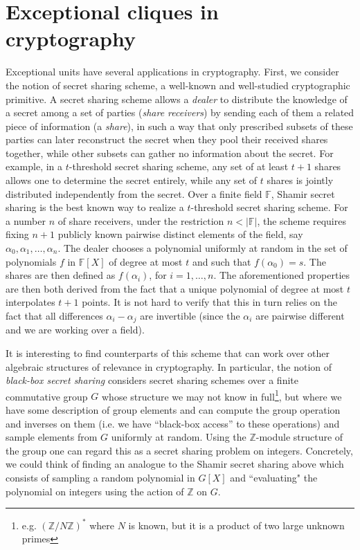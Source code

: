 \documentclass{amsart}
\theoremstyle{plain}
\theoremstyle{definition}
\newcommand{\Z}{\ensuremath{\mathbb{Z}}}
\newcommand{\F}{\ensuremath{\mathbb{F}}}
\begin{document}
\section{Exceptional cliques in cryptography}\label{sec:exceptional_cliques_in_cryptography}

Exceptional units have several applications in cryptography. First, we consider the notion of secret sharing scheme, a well-known and well-studied cryptographic primitive. A secret sharing scheme allows a \textit{dealer} to distribute the knowledge of a secret among a set of parties (\textit{share receivers}) by sending each of them a related piece of information (a \textit{share}), in such a way that only prescribed subsets of these parties can later reconstruct the secret when they pool their received shares together, while other subsets can gather no information about the secret. For example, in a $t$-threshold secret sharing scheme, any set of at least $t+1$ shares allows one to determine the secret entirely, while any set of $t$ shares is jointly distributed independently from the secret. Over a finite field $\F$, Shamir secret sharing \cite{Sha79} is the best known way to realize a $t$-threshold secret sharing scheme. For a number $n$ of share receivers, under the restriction $n<|\F|$, the scheme requires fixing $n+1$ publicly known pairwise distinct elements of the field, say $\alpha_0,\alpha_1,\dots,\alpha_n$. The dealer chooses a polynomial uniformly at random in the set of polynomials $f$ in $\F[X]$ of degree at most $t$ and such that $f(\alpha_0)=s$. The shares are then defined as $f(\alpha_i)$, for $i=1,\dots,n$. The aforementioned properties are then both derived from the fact that a unique polynomial of degree at most $t$ interpolates $t+1$ points. It is not hard to verify that this in turn relies on the fact that all differences $\alpha_i-\alpha_j$ are invertible (since the $\alpha_i$ are pairwise different and we are working over a field).  

It is interesting to find counterparts of this scheme that can work over other algebraic structures of relevance in cryptography. In particular, the notion of \textit{black-box secret sharing} \cite{DF94} considers secret sharing schemes over a finite commutative group $G$ whose structure we may not know in full\footnote{e.g. $(\Z/N\Z)^*$ where $N$ is known, but it is a product of two large unknown primes}, but where we have some description of group elements and can compute the group operation and inverses on them (i.e. we have ``black-box access'' to these operations) and sample elements from $G$ uniformly at random. Using the $\Z$-module structure of the group one can regard this as a secret sharing problem on integers. Concretely, we could think of finding an analogue to the Shamir secret sharing above which consists of sampling a random polynomial in $G[X]$ and ``evaluating" the polynomial on integers using the action of $\Z$ on $G$.
\end{document}
